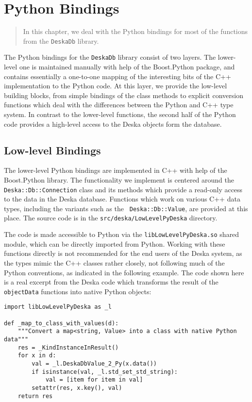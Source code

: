 \documentclass[deska]{subfiles}
\begin{document}
\chapter{Python Bindings}
\label{sec:python-bindings}

\begin{abstract}
In this chapter, we deal with the Python bindings for most of the functions from the  {\tt DeskaDb} library.
\end{abstract}

The Python bindings for the {\tt DeskaDb} library consist of two layers.  The lower-level one is maintained
manually with help of the Boost.Python package, and contains essentially a one-to-one mapping of the interesting bits of
the C++ implementation to the Python code.  At this layer, we provide the low-level building blocks, from simple
bindings of the class methods to explicit conversion functions which deal with the differences between the Python and
C++ type system.  In contrast to the lower-level functions, the second half of the Python code provides a high-level
access to the Deska objects form the database.

\section{Low-level Bindings}

The lower-level Python bindings are implemented in C++ with help of the Boost.Python library.  The functionality we
implement is centered around the {\tt Deska::Db::Connection} class and its methods which provide a read-only access to
the data in the Deska database.  Functions which work on various C++ data types, including the variants such as the {\tt
Deska::Db::Value}, are provided at this place.  The source code is in the {\tt src/deska/LowLevelPyDeska} directory.

The code is made accessible to Python via the {\tt libLowLevelPyDeska.so} shared module, which can be directly imported
from Python.  Working with these functions directly is not recommended for the end users of the Deska system, as the
types mimic the C++ classes rather closely, not following much of the Python conventions, as indicated in the following
example.  The code shown here is a real excerpt from the Deska code which transforms the result of the {\tt objectData}
functions into native Python objects:

\begin{verbatim}
import libLowLevelPyDeska as _l

def _map_to_class_with_values(d):
    """Convert a map<string, Value> into a class with native Python data"""
    res = _KindInstanceInResult()
    for x in d:
        val = _l.DeskaDbValue_2_Py(x.data())
        if isinstance(val, _l.std_set_std_string):
            val = [item for item in val]
        setattr(res, x.key(), val)
    return res
\end{verbatim}
\end{document}
